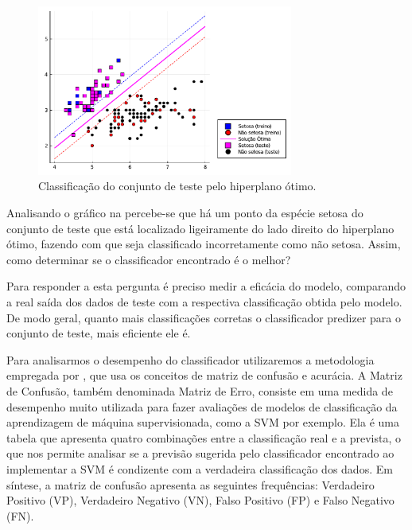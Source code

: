 \documentclass[12pt,a4paper]{scrartcl}
\theoremstyle{definition}%
\newcommand{\prompt}[4]{
        \ttfamily\llap{{\color{#2}[#3]:\hspace{3pt}#4}}\vspace{-\baselineskip}
    }
\begin{document}
            
{%

     \begin{figure}
         \centering
         \includegraphics[width=0.75\textwidth]{Implementacao_de_SVM_em_Julia_TCC_files/Implementacao_de_SVM_em_Julia_TCC_20_0.pdf}
         \caption{Classificação do conjunto de teste pelo hiperplano ótimo.}
         \label{fig:classificacao_conjunto_teste_margem_rigida}
     \end{figure}
    } 

Analisando o gráfico na  percebe-se que há um ponto da espécie setosa
do conjunto de teste que está localizado ligeiramente do lado direito do
hiperplano ótimo, fazendo com que seja classificado incorretamente como
não setosa. Assim, como determinar se o classificador encontrado é o
melhor?

Para responder a esta pergunta é preciso medir a eficácia do modelo,
comparando a real saída dos dados de teste com a respectiva
classificação obtida pelo modelo. De modo geral, quanto mais
classificações corretas o classificador predizer para o conjunto de
teste, mais eficiente ele é.

Para analisarmos o desempenho do classificador utilizaremos a metodologia empregada por \textcite{Evelin2017}, que usa os conceitos de matriz de confusão e acurácia. A Matriz de Confusão, também denominada Matriz de Erro, consiste em uma medida de desempenho muito utilizada para fazer avaliações de modelos de classificação da aprendizagem de máquina supervisionada, como a SVM por exemplo. Ela é uma tabela que apresenta quatro combinações entre a classificação real e a prevista, o que nos permite analisar se a previsão sugerida pelo classificador encontrado ao implementar a SVM é condizente com a verdadeira classificação dos dados. Em síntese, a matriz de confusão apresenta as seguintes frequências: Verdadeiro Positivo (VP), Verdadeiro Negativo (VN), Falso Positivo (FP) e Falso Negativo (FN).
\end{document}
